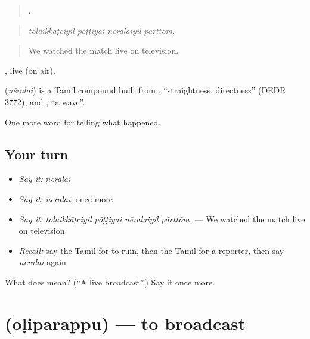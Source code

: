 \begin{quote}
   .
\end{quote}

\begin{quote}
\emph{tolaikkāṭciyil pōṭṭiyai nēralaiyil pārttōm.}
\end{quote}

\begin{quote}
We watched the match live on television.
\end{quote}

, live (on air).

\begin{cousinweb}
\textbf{} (\emph{nēralai}) is a Tamil compound built from , \textquotedblleft{}straightness, directness\textquotedblright{} (DEDR 3772), and , \textquotedblleft{}a wave\textquotedblright{}.
\end{cousinweb}

\begin{grammarlens}[title={What you've built}]
One more word for telling what happened.
\end{grammarlens}

\subsection*{Your turn}
\begin{itemize}
\raggedright
  \item \emph{Say it:} \emph{nēralai}
  \item \emph{Say it:} \emph{nēralai}, once more
  \item \emph{Say it:} \emph{tolaikkāṭciyil pōṭṭiyai nēralaiyil pārttōm.} — We watched the match live on television.
  \item \emph{Recall:} say the Tamil for to ruin, then the Tamil for a reporter, then say \emph{nēralai} again
\end{itemize}

\begin{tcolorbox}[breakable,colback=teal!4,colframe=teal!35!black,title={Before you move on}]
What does  mean? (\textquotedblleft{}A live broadcast\textquotedblright{}.) Say it once more.
\end{tcolorbox}
\section[\texorpdfstring{\ta{ஒளிபரப்பு} (oḷiparappu)}{ஒளிபரப்பு (oḷiparappu)}]{ (oḷiparappu) — to broadcast}

